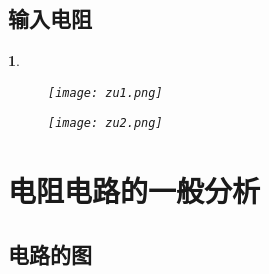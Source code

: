 \documentclass[UTF8]{report}
\theoremstyle{MyLineTheoremStyle} %
\theoremstyle{MyBlockTheoremStyle} %
\theoremstyle{MySubsubsectionStyle} %
\newtheorem{definition}{}
\begin{document}
\section{输入电阻}

\begin{definition}
    \begin{figure}[H]
        \centering
        \texttt{[image: zu1.png]}
    \end{figure}

    \begin{figure}[H]
        \centering
        \texttt{[image: zu2.png]}
    \end{figure}
\end{definition}

\chapter{电阻电路的一般分析}

\section{电路的图}
\end{document}
